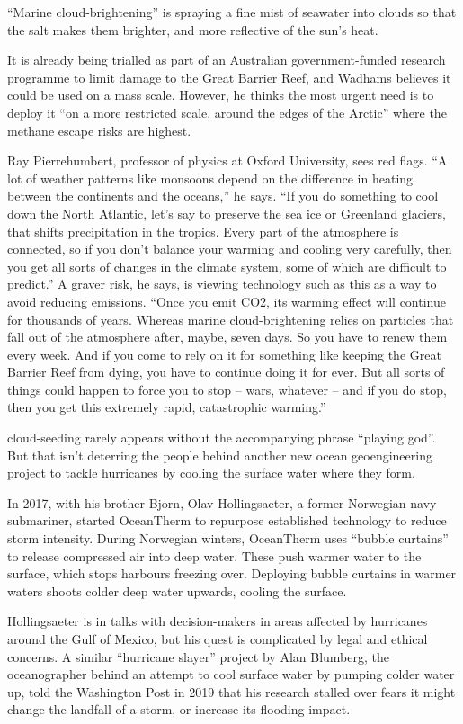 \documentclass[
]{book}
\begin{document}
``Marine cloud-brightening'' is spraying a fine mist of seawater into clouds so that the salt makes them brighter, and more reflective of the sun's heat.

It is already being trialled as part of an Australian government-funded research programme to limit damage to the Great Barrier Reef, and Wadhams believes it could be used on a mass scale. However, he thinks the most urgent need is to deploy it ``on a more restricted scale, around the edges of the Arctic'' where the methane escape risks are highest.

Ray Pierrehumbert, professor of physics at Oxford University, sees red flags.
``A lot of weather patterns like monsoons depend on the difference in heating between the continents and the oceans,'' he says. ``If you do something to cool down the North Atlantic, let's say to preserve the sea ice or Greenland glaciers, that shifts precipitation in the tropics. Every part of the atmosphere is connected, so if you don't balance your warming and cooling very carefully, then you get all sorts of changes in the climate system, some of which are difficult to predict.''
A graver risk, he says, is viewing technology such as this as a way to avoid reducing emissions. ``Once you emit CO2, its warming effect will continue for thousands of years. Whereas marine cloud-brightening relies on particles that fall out of the atmosphere after, maybe, seven days. So you have to renew them every week. And if you come to rely on it for something like keeping the Great Barrier Reef from dying, you have to continue doing it for ever. But all sorts of things could happen to force you to stop -- wars, whatever -- and if you do stop, then you get this extremely rapid, catastrophic warming.''

cloud-seeding rarely appears without the accompanying phrase ``playing god''. But that isn't deterring the people behind another new ocean geoengineering project to tackle hurricanes by cooling the surface water where they form.

In 2017, with his brother Bjorn, Olav Hollingsaeter, a former Norwegian navy submariner, started OceanTherm to repurpose established technology to reduce storm intensity. During Norwegian winters, OceanTherm uses ``bubble curtains'' to release compressed air into deep water. These push warmer water to the surface, which stops harbours freezing over. Deploying bubble curtains in warmer waters shoots colder deep water upwards, cooling the surface.

Hollingsaeter is in talks with decision-makers in areas affected by hurricanes around the Gulf of Mexico, but his quest is complicated by legal and ethical concerns. A similar ``hurricane slayer'' project by Alan Blumberg, the oceanographer behind an attempt to cool surface water by pumping colder water up, told the Washington Post in 2019 that his research stalled over fears it might change the landfall of a storm, or increase its flooding impact.
\end{document}
